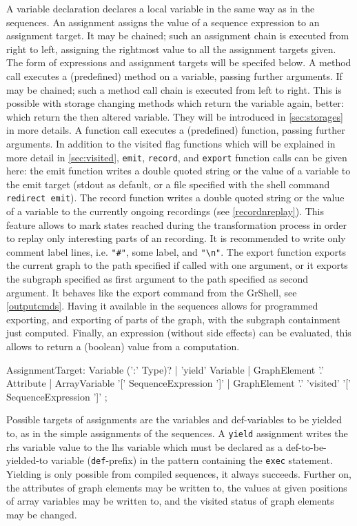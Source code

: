A variable declaration declares a local variable in the same way as in the sequences.
An assignment assigns the value of a sequence expression to an assignment target.
It may be chained; such an assignment chain is executed from right to left, assigning the rightmost value to all the assignment targets given.
The form of expressions and assignment targets will be specifed below.
A method call executes a (predefined) method on a variable, passing further arguments.
If may be chained; such a method call chain is executed from left to right. 
This is possible with storage changing methods which return the variable again, better: which return the then altered variable. 
They will be introduced in \ref{sec:storages} in more details.
A function call executes a (predefined) function, passing further arguments.
In addition to the visited flag functions which will be explained in more detail in \ref{sec:visited},
\texttt{emit}, \texttt{record}, and \texttt{export} function calls can be given here: the emit function writes a double quoted string or the value of a variable to the emit target (stdout as default, or a file specified with the shell command \texttt{redirect emit}).
The record function writes a double quoted string or the value of a variable to the currently ongoing recordings (see \ref{recordnreplay}). This feature allows to mark states reached during the transformation process in order to replay only interesting parts of an recording. It is recommended to write only comment label lines, i.e. \verb/"#"/, some label, and \verb/"\n"/.
The export function exports the current graph to the path specified if called with one argument, or it exports the subgraph specified as first argument to the path specified as second argument.
It behaves like the export command from the GrShell, see \ref{outputcmds}.
Having it available in the sequences allows for programmed exporting, and exporting of parts of the graph, with the subgraph containment just computed.
Finally, an expression (without side effects) can be evaluated, this allows to return a (boolean) value from a computation.

\begin{rail}
  AssignmentTarget: 
    Variable (':' Type)? |
    'yield' Variable |
    GraphElement '.' Attribute |
    ArrayVariable '[' SequenceExpression ']' |
    GraphElement '.' 'visited' '[' SequenceExpression ']'
;
\end{rail}

Possible targets of assignments are the variables and def-variables to be yielded to, as in the simple assignments of the sequences. 
A \texttt{yield} assignment writes the rhs variable value to the lhs variable which must be declared as a  def-to-be-yielded-to variable (\texttt{def}-prefix) in the pattern containing the \texttt{exec} statement.
Yielding is only possible from compiled sequences, it always succeeds.
Further on, the attributes of graph elements may be written to, the values at given positions of array variables may be written to, and the visited status of graph elements may be changed.

